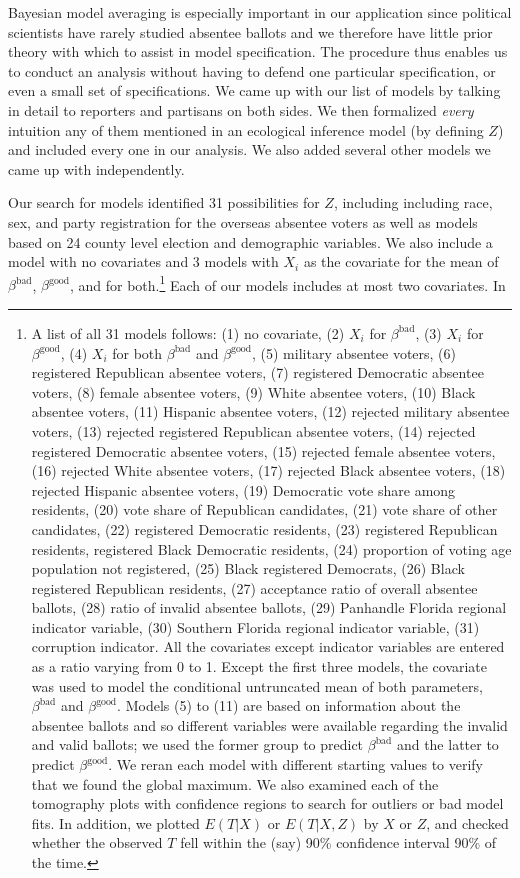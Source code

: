 \documentclass[11pt,titlepage]{article}
\newcommand{\bb}{\beta^{\text{bad}}}
\newcommand{\bg}{\beta^{\text{good}}}
\begin{document}
Bayesian model averaging is especially important in our application
since political scientists have rarely studied absentee ballots and we
therefore have little prior theory with which to assist in model
specification.  The procedure thus enables us to conduct an analysis
without having to defend one particular specification, or even a small
set of specifications.  We came up with our list of models by talking
in detail to reporters and partisans on both sides.  We then
formalized \emph{every} intuition any of them mentioned in an
ecological inference model (by defining $Z$) and included every one in
our analysis.  We also added several other models we came up with
independently.

Our search for models identified 31 possibilities for $Z$, including
including race, sex, and party registration for the overseas absentee
voters as well as models based on 24 county level election and
demographic variables.  We also include a model with no covariates and
3 models with $X_i$ as the covariate for the mean of $\bb$, $\bg$, and
for both.\footnote{\label{f:models}A list of all 31 models follows:
  (1) no covariate, (2) $X_i$ for $\bb$, (3) $X_i$ for $\bg$, (4)
  $X_i$ for both $\bb$ and $\bg$, (5) military absentee voters, (6)
  registered Republican absentee voters, (7) registered Democratic
  absentee voters, (8) female absentee voters, (9) White absentee
  voters, (10) Black absentee voters, (11) Hispanic absentee voters,
  (12) rejected military absentee voters, (13) rejected registered
  Republican absentee voters, (14) rejected registered Democratic
  absentee voters, (15) rejected female absentee voters, (16) rejected
  White absentee voters, (17) rejected Black absentee voters, (18)
  rejected Hispanic absentee voters, (19) Democratic vote share among
  residents, (20) vote share of Republican candidates, (21) vote share
  of other candidates, (22) registered Democratic residents, (23)
  registered Republican residents, registered Black Democratic
  residents, (24) proportion of voting age population not registered,
  (25) Black registered Democrats, (26) Black registered Republican
  residents, (27) acceptance ratio of overall absentee ballots, (28)
  ratio of invalid absentee ballots, (29) Panhandle Florida regional
  indicator variable, (30) Southern Florida regional indicator
  variable, (31) corruption indicator. All the covariates except
  indicator variables are entered as a ratio varying from 0 to 1.
  Except the first three models, the covariate was used to model the
  conditional untruncated mean of both parameters, $\bb$ and $\bg$.
  Models (5) to (11) are based on information about the absentee
  ballots and so different variables were available regarding the
  invalid and valid ballots; we used the former group to predict $\bb$
  and the latter to predict $\bg$.  We reran each model with different
  starting values to verify that we found the global maximum.  We also
  examined each of the tomography plots with confidence regions to
  search for outliers or bad model fits.  In addition, we plotted
  $E(T|X)$ or $E(T|X,Z)$ by $X$ or $Z$, and checked whether the
  observed $T$ fell within the (say) 90\% confidence interval 90\% of
  the time.}  Each of our models includes at most two covariates.  In
\end{document}
